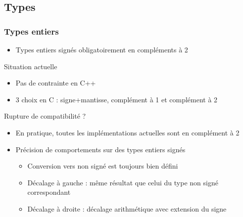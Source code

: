 \documentclass[C++.tex]{subfiles}
\begin{document}
\subsection*{Types}
\begin{frame}[fragile]
	\frametitle{Types entiers}
	\begin{itemize}
		\item Types entiers signés obligatoirement en compléments à 2
	\end{itemize}

	\begin{block}{Situation actuelle}
		\begin{itemize}
			\item Pas de contrainte en C++
			\item 3 choix en C : signe+mantisse, complément à 1 et complément à 2
		\end{itemize}
	\end{block}


	\begin{alertblock}{Rupture de compatibilité ?}
		\begin{itemize}
			\item En pratique, toutes les implémentations actuelles sont en complément à 2
		\end{itemize}
	\end{alertblock}

	\begin{itemize}
		\item Précision de comportements sur des types entiers signés
		\begin{itemize}
			\item Conversion vers non signé est toujours bien défini


			\item Décalage à gauche : même résultat que celui du type non signé correspondant
			\item Décalage à droite : décalage arithmétique avec extension du signe
		\end{itemize}
	\end{itemize}
\end{frame}
\end{document}

